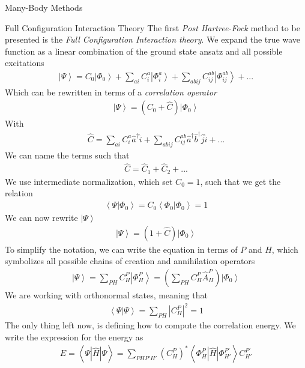 \documentclass[twoside,english]{uiofysmaster}
\begin{document}
\begin{chapter}{Many-Body Methods}
	\begin{section}{Full Configuration Interaction Theory}
		The first \textit{Post Hartree-Fock} method to be presented is the \textit{Full Configuration Interaction theory}. We expand the true wave function as a linear combination of the ground state ansatz and all possible excitations
		\begin{align}
			\left| \Psi \right> = C_0 \left| \Phi_0 \right> + \sum_{ai} C_i^a \left| \Phi_i^a \right> + \sum_{abij} C_{ij}^{ab} \left| \Phi_{ij}^{ab} \right> + ... 
		\end{align}
		Which can be rewritten in terms of a \textit{correlation operator}
		\begin{align}
			\left| \Psi \right> = ( C_0 + \hat C) \left| \Phi_0 \right> 
		\end{align}
		With
		\begin{align}
			\hat C = \sum_{ai} C_i^a \hat a^\dagger \hat i + \sum_{abij} C_{ij}^{ab} \hat a^\dagger \hat b^\dagger \hat j \hat i + ...
		\end{align}
		We can name the terms such that
		\begin{align}
			\hat C = \hat C_1 + \hat C_2 + ...
		\end{align}
		We use intermediate normalization, which set $C_0 = 1$, such that we get the relation
		\begin{align}
			\left< \Psi | \Phi_0 \right> = C_0 \left< \Phi_0 | \Phi_0 \right> = 1 
		\end{align}
		We can now rewrite $\left| \Psi \right>$
		\begin{align}
			\left| \Psi \right> = (1 + \hat C) \left| \Phi_0 \right> 
		\end{align}
		To simplify the notation, we can write the equation in terms of $P$ and $H$, which symbolizes all possible chains of creation and annihilation operators
		\begin{align}
			\left| \Psi \right> = \sum_{PH} C_H^P \left| \Phi_H^P \right> = \left( \sum_{PH} C_H^P \hat A_H^P \right) \left| \Phi_0 \right>  
		\end{align}
		We are working with orthonormal states, meaning that 
		\begin{align}
			\left< \Psi | \Psi \right> = \sum_{PH} \left| C_H^P \right|^2 = 1
		\end{align}
		The only thing left now, is defining how to compute the correlation energy. We write the expression for the energy as
		\begin{align}
			E = \left< \right. \Psi | \hat H | \Psi \left. \right> = \sum_{PHP'H'} (C^P_H)^* \left< \right. \Phi_H^P | \hat H | \Phi_{H'}^{P'} \left. \right> C_{H'}^{P'} 	
		\end{align} 
		

\end{section}
\end{chapter}
\end{document}
